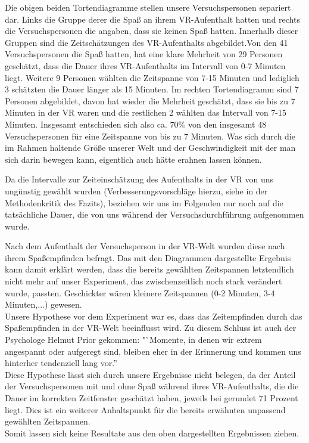 \documentclass{Paper}
\begin{document}
Die obigen beiden Tortendiagramme stellen unsere Versuchspersonen separiert dar. Links die Gruppe derer die Spaß an ihrem VR-Aufenthalt hatten und rechts die Versuchspersonen die angaben, dass sie keinen Spaß hatten. Innerhalb dieser Gruppen sind die Zeitschätzungen des VR-Aufenthalts abgebildet.Von den 41 Versuchspersonen die Spaß hatten, hat eine klare Mehrheit von 29 Personen geschätzt, dass die Dauer ihres VR-Aufenthalts im Intervall von 0-7 Minuten liegt. Weitere 9 Personen wählten die Zeitspanne von 7-15 Minuten und lediglich 3 schätzten die Dauer länger als 15 Minuten. Im rechten Tortendiagramm sind 7 Personen abgebildet, davon hat wieder die Mehrheit geschätzt, dass sie bis zu 7 Minuten in der VR waren und die restlichen 2 wählten das Intervall von 7-15 Minuten. Insgesamt entschieden sich also ca. 70\% von den insgesamt 48 Versuchspersonen für eine Zeitspanne von bis zu 7 Minuten. Was sich durch die im Rahmen haltende Größe unserer Welt und der Geschwindigkeit mit der man sich darin bewegen kann, eigentlich auch hätte erahnen lassen können.

Da die Intervalle zur Zeiteinschätzung des Aufenthalts in der VR von uns ungünstig gewählt wurden (Verbesserungsvorschläge hierzu, siehe in der Methodenkritik des Fazits), beziehen wir uns im Folgenden nur noch auf die tatsächliche Dauer, die von uns während der Versuchsdurchführung aufgenommen wurde.

Nach dem Aufenthalt der Versuchsperson in der VR-Welt wurden diese nach ihrem Spaßempfinden befragt. Das mit den Diagrammen dargestellte Ergebnis kann damit erklärt werden, dass die bereits gewählten Zeitspannen letztendlich nicht mehr auf unser Experiment, das zwischenzeitlich noch stark verändert wurde, passten. Geschickter wären kleinere Zeitspannen (0-2 Minuten, 3-4 Minuten,...) gewesen.\\
Unsere Hypothese vor dem Experiment war es, dass das Zeitempfinden durch das Spaßempfinden in der VR-Welt beeinflusst wird. Zu diesem Schluss ist auch der Psychologe Helmut Prior gekommen: "`Momente, in denen wir extrem angespannt oder aufgeregt sind, bleiben eher in der Erinnerung und kommen uns hinterher tendenziell lang vor.'' \cite{Irle2017} \\
Diese Hypothese lässt sich durch unsere Ergebnisse nicht belegen, da der Anteil der Versuchspersonen mit und ohne Spaß während ihres VR-Aufenthalts, die die Dauer im korrekten Zeitfenster geschätzt haben, jeweils bei gerundet 71 Prozent liegt. Dies ist ein weiterer Anhaltspunkt für die bereits erwähnten unpassend gewählten Zeitspannen.\\
Somit lassen sich keine Resultate aus den oben dargestellten Ergebnissen ziehen.
\end{document}
